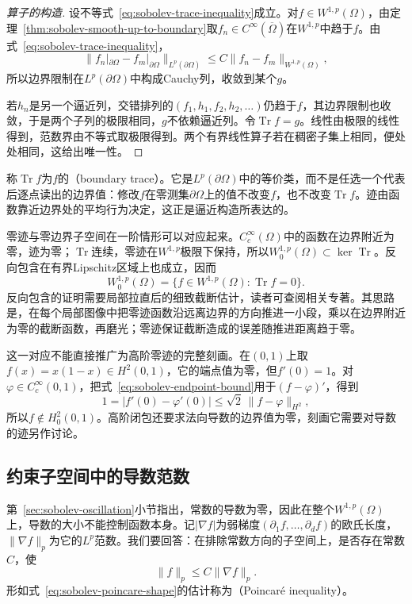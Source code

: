 \begin{proof}[算子的构造]
设不等式~\eqref{eq:sobolev-trace-inequality}成立。对$f\in W^{1,p}(\Omega)$，由定理~\ref{thm:sobolev-smooth-up-to-boundary}取$f_n\in C^\infty(\overline\Omega)$在$W^{1,p}$中趋于$f$。由式~\eqref{eq:sobolev-trace-inequality}，
\[
\lVert f_n|_{\partial\Omega}-f_m|_{\partial\Omega}\rVert_{L^p(\partial\Omega)}\leq C\lVert f_n-f_m\rVert_{W^{1,p}(\Omega)},
\]
所以边界限制在$L^p(\partial\Omega)$中构成Cauchy列，收敛到某个$g$。

若$h_n$是另一个逼近列，交错排列的$(f_1,h_1,f_2,h_2,\ldots)$仍趋于$f$，其边界限制也收敛，于是两个子列的极限相同，$g$不依赖逼近列。令$\operatorname{Tr}f=g$。线性由极限的线性得到，范数界由不等式取极限得到。两个有界线性算子若在稠密子集上相同，便处处相同，这给出唯一性。
\end{proof}

称$\operatorname{Tr}f$为$f$的（boundary trace）。它是$L^p(\partial\Omega)$中的等价类，而不是任选一个代表后逐点读出的边界值：修改$f$在零测集$\partial\Omega$上的值不改变$f$，也不改变$\operatorname{Tr}f$。迹由函数靠近边界处的平均行为决定，这正是逼近构造所表达的。

零迹与零边界子空间在一阶情形可以对应起来。$C_c^\infty(\Omega)$中的函数在边界附近为零，迹为零；$\operatorname{Tr}$连续，零迹在$W^{1,p}$极限下保持，所以$W_0^{1,p}(\Omega)\subset\ker\operatorname{Tr}$。反向包含在有界Lipschitz区域上也成立，因而
\begin{equation}
W_0^{1,p}(\Omega)=\{f\in W^{1,p}(\Omega):\operatorname{Tr}f=0\}.
\label{eq:sobolev-zero-trace}
\end{equation}
反向包含的证明需要局部拉直后的细致截断估计，读者可查阅相关专著。其思路是，在每个局部图像中把零迹函数沿远离边界的方向推进一小段，乘以在边界附近为零的截断函数，再磨光；零迹保证截断造成的误差随推进距离趋于零。

这一对应不能直接推广为高阶零迹的完整刻画。在$(0,1)$上取$f(x)=x(1-x)\in H^2(0,1)$，它的端点值为零，但$f'(0)=1$。对$\varphi\in C_c^\infty(0,1)$，把式~\eqref{eq:sobolev-endpoint-bound}用于$(f-\varphi)'$，得到
\[
1=|f'(0)-\varphi'(0)|\leq\sqrt2\,\lVert f-\varphi\rVert_{H^2},
\]
所以$f\notin H_0^2(0,1)$。高阶闭包还要求法向导数的边界值为零，刻画它需要对导数的迹另作讨论。

\subsection{约束子空间中的导数范数}
\label{sec:sobolev-derivative-norms}

第~\ref{sec:sobolev-oscillation}小节指出，常数的导数为零，因此在整个$W^{1,p}(\Omega)$上，导数的大小不能控制函数本身。记$|\nabla f|$为弱梯度$(\partial_1f,\ldots,\partial_df)$的欧氏长度，$\lVert\nabla f\rVert_p$为它的$L^p$范数。我们要回答：在排除常数方向的子空间上，是否存在常数$C$，使
\begin{equation}
\lVert f\rVert_p\leq C\lVert\nabla f\rVert_p .
\label{eq:sobolev-poincare-shape}
\end{equation}
形如式~\eqref{eq:sobolev-poincare-shape}的估计称为（Poincaré inequality）。

